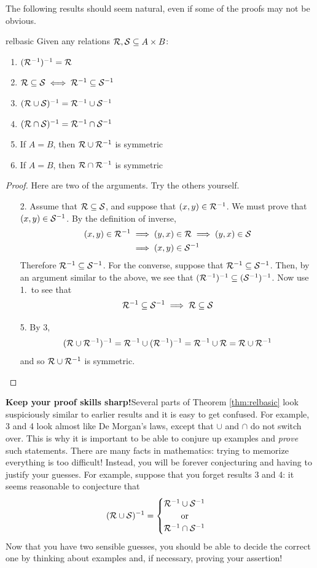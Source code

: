 The following results should seem natural, even if some of the proofs may not be obvious.

\begin{thm}{}{relbasic}
	Given any relations $\mathcal{R},\mathcal{S}\subseteq A\times B$:
	\begin{enumerate}
		\item $(\mathcal{R}^{-1})^{-1}=\mathcal{R}$
		\item $\mathcal{R}\subseteq \mathcal{S}\iff \mathcal{R}^{-1}\subseteq \mathcal{S}^{-1}$
		\item $(\mathcal{R}\cup \mathcal{S})^{-1}=\mathcal{R}^{-1}\cup \mathcal{S}^{-1}$
		\item $(\mathcal{R}\cap \mathcal{S})^{-1}=\mathcal{R}^{-1}\cap \mathcal{S}^{-1}$
		\item If $A=B$, then $\mathcal{R}\cup \mathcal{R}^{-1}$ is symmetric
		\item If $A=B$, then $\mathcal{R}\cap \mathcal{R}^{-1}$ is symmetric
	\end{enumerate}
\end{thm}

\begin{proof}
	Here are two of the arguments. Try the others yourself.
	\begin{enumerate}
		\item[2.] Assume that $\mathcal{R}\subseteq\mathcal{S}$, and suppose that $(x,y)\in\mathcal{R}^{-1}$. We must prove that $(x,y)\in\mathcal{S}^{-1}$. By the definition of inverse,
		\begin{align*}
			(x,y)\in\mathcal{R}^{-1}&\implies (y,x)\in\mathcal{R}\implies (y,x)\in\mathcal{S}\\
			&\implies (x,y)\in\mathcal{S}^{-1}
		\end{align*}
		Therefore $\mathcal{R}^{-1}\subseteq\mathcal{S}^{-1}$. For the converse, suppose that $\mathcal{R}^{-1}\subseteq\mathcal{S}^{-1}$. Then, by an argument similar to the above, we see that $(\mathcal{R}^{-1})^{-1}\subseteq (\mathcal{S}^{-1})^{-1}$. Now use 1.\ to see that
		\[
			\mathcal{R}^{-1}\subseteq\mathcal{S}^{-1}\implies\mathcal{R}\subseteq \mathcal{S}
		\]
		\item[5.] By 3,
		\[
			(\mathcal{R}\cup \mathcal{R}^{-1})^{-1}=\mathcal{R}^{-1}\cup (\mathcal{R}^{-1})^{-1}=\mathcal{R}^{-1}\cup \mathcal{R}=\mathcal{R}\cup \mathcal{R}^{-1}
		\]
		and so $\mathcal{R}\cup \mathcal{R}^{-1}$ is symmetric.\qedhere
	\end{enumerate}
\end{proof}

{\bf Keep your proof skills sharp!}\quad Several parts of Theorem \ref{thm:relbasic} look suspiciously similar to earlier results and it is easy to get confused. For example, 3 and 4 look almost like De Morgan's laws, except that $\cup$ and $\cap$ do not switch over. This is why it is important to be able to conjure up examples and \emph{prove} such statements. There are many facts in mathematics: trying to memorize everything is too difficult! Instead, you will be forever conjecturing and having to justify your guesses. For example, suppose that you forget results 3 and 4: it seems reasonable to conjecture that
\[
	(\mathcal{R}\cup \mathcal{S})^{-1}=
	\begin{cases}
		\mathcal{R}^{-1}\cup \mathcal{S}^{-1}\\
		\qquad\text{or}\\
		\mathcal{R}^{-1}\cap \mathcal{S}^{-1}
	\end{cases}
\]
Now that you have two sensible guesses, you should be able to decide the correct one by thinking about examples and, if necessary, proving your assertion!

